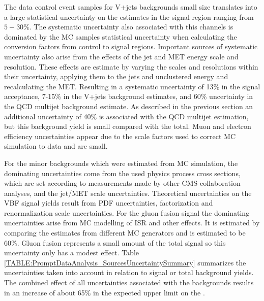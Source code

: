 The data control event samples for V+jets backgrounds small size translates into a large statistical uncertainty on the estimates in the signal region ranging from $5-30\%$. The systematic uncertainty also associated with this channels is dominated by the \gls{MC} samples statistical uncertainty when calculating the conversion factors from control to signal regions. Important sources of systematic uncertainty also arise from the effects of the jet and \gls{MET} energy scale and resolution. These effects are estimate by varying the scales and resolutions within their uncertainty, applying them to the jets and unclustered energy and recalculating the \gls{MET}. Resulting in a systematic uncertainty of 13\% in the signal acceptance, 7-15\% in the V+jets background estimates, and 60\% uncertainty in the \gls{QCD} multijet background estimate. As described in the previous section an additional uncertainty of 40\% is associated with the \gls{QCD} multijet estimation, but this background yield is small compared with the total. Muon and electron efficiency uncertainties appear due to the scale factors used to correct \gls{MC} simulation to data and are small. 

For the minor backgrounds which were estimated from \gls{MC} simulation, the dominating uncertainties come from the used physics process cross sections, which are set according to measurements made by other \gls{CMS} collaboration analyses, and the jet/\gls{MET} scale uncertainties. Theoretical uncertainties on the \gls{VBF} signal yields result from \gls{PDF} uncertainties, factorization and renormalization scale uncertainties. For the gluon fusion signal the dominating uncertainties arise from \gls{MC} modelling of \gls{ISR} and other effects. It is estimated by comparing the estimates from different \gls{MC} generators and is estimated to be 60\%. Gluon fusion represents a small amount of the total signal so this uncertainty only has a modest effect. Table \ref{TABLE:PromptDataAnalysis_SourcesUncertaintySummary} summarizes the uncertainties taken into account in relation to signal or total background yields. The combined effect of all uncertainties associated with the backgrounds results in an increase of about 65\% in the expected upper limit on the \BRinv.

